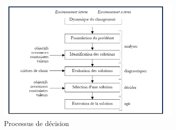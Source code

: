 \begin{figure}[!h]
\begin{center}
\includegraphics[height=6cm]{aide_multicrit_decision/environement.png}
\end{center}
\caption{Processus de décision}
\end{figure}

